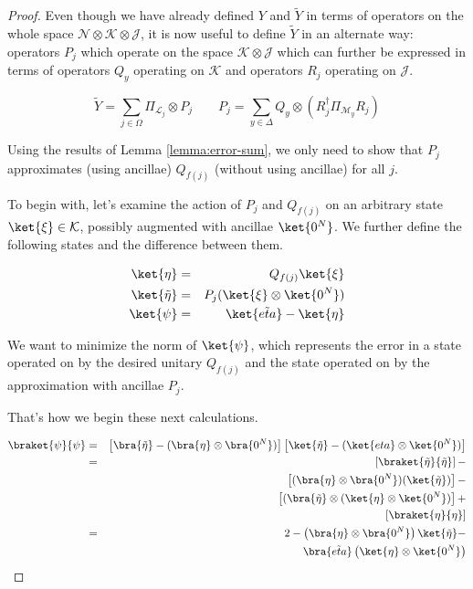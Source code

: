 \begin{proof}
Even though we have already defined $Y$ and $\tilde{Y}$ in terms of
operators on the whole space
$\mathcal{N} \otimes \mathcal{K} \otimes \mathcal{J}$, it is now useful to
define $\tilde{Y}$ in an alternate way: operators $P_j$ which operate on the
space $\mathcal{K} \otimes \mathcal{J}$ which can further be expressed
in terms of operators $Q_y$ operating on $\mathcal{K}$ and operators
$R_j$ operating on $\mathcal{J}$.

\begin{equation}
\tilde{Y} = \sum_{j \in \Omega} \Pi_{\mathcal{L}_j} \otimes P_j \qquad
P_j = \sum_{y \in \Delta} Q_y \otimes (R_j^{\dagger}\Pi_{\mathcal{M}_y}R_j)
\end{equation}

Using the results of Lemma \ref{lemma:error-sum}, we only need to show that
$P_j$ approximates (using ancillae) $Q_{f(j)}$ (without using ancillae) for
all $j$.

To begin with, let's examine the action of $P_j$ and $Q_{f(j)}$ on
an arbitrary state $\ket{\xi} \in \mathcal{K}$, possibly augmented with
ancillae $\ket{0^N}$.
We further define the following states and the difference between them.

\begin{eqnarray}
\ket{\eta}         & = & Q_{f(j)} \ket{\xi} \\
\ket{\tilde{\eta}} & = & P_j(\ket{\xi} \otimes \ket{0^N}) \\
\ket{\psi}         & = & \ket{\tilde{eta}} - \ket{\eta}
\end{eqnarray}

We want to minimize the norm of $\ket{\psi}$, which represents the error
in a state operated on by the desired unitary $Q_{f(j)}$ and the state
operated on by the approximation with ancillae $P_j$.

That's how we begin these next calculations.

\begin{eqnarray}
\braket{\psi}{\psi} & = & \left[ \bra{\tilde{\eta}} - (\bra{\eta} \otimes \bra{0^N}) \right]
                    \left[ \ket{\tilde{\eta}} - (\ket{eta} \otimes \ket{0^N}) \right] \\
              & = & \left[ \braket{\tilde{\eta}}{\tilde{\eta}} \right ] - \\
              &   & \left[ (\bra{\eta} \otimes \bra{0^N})(\ket{\tilde{\eta}}) \right] - \\
              &   & \left[ (\bra{\tilde{\eta}} \otimes (\ket{\eta} \otimes \ket{0^N}) \right] + \\
              &   & \left[ \braket{\eta}{\eta} \right] \\
              & = & 2 - \left(\bra{\eta} \otimes \bra{0^N} \right) \ket{\tilde{\eta}} - \\
              &   & \bra{\tilde{eta}} \left( \ket{\eta} \otimes \ket{0^N} \right)
\end{eqnarray}


\end{proof}
